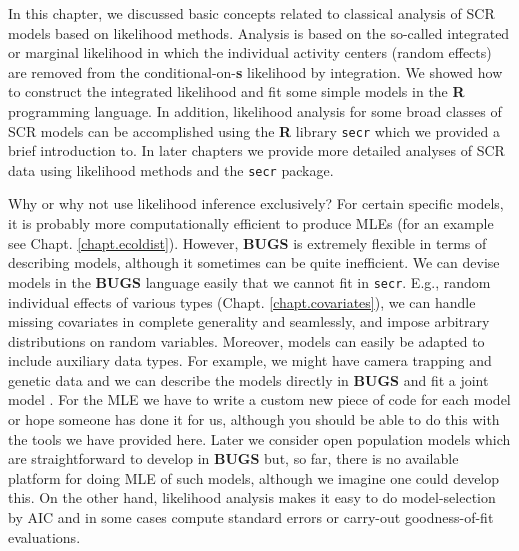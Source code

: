In this chapter, we discussed basic concepts related to classical
analysis of SCR models based on likelihood methods. Analysis is based
on the so-called integrated or marginal likelihood in which the
individual activity centers (random effects) are removed from the
conditional-on-{\bf s} likelihood by integration. We showed how to
construct the integrated likelihood and fit some simple models in the
{\bf R} programming language.  In addition, likelihood analysis for
some broad classes of SCR models can be accomplished using the {\bf R}
library \mbox{\tt secr} \citep{efford:2011} which we provided a brief
introduction to. In later chapters we provide more detailed analyses
of SCR data using likelihood methods and the \mbox{\tt secr} package.

\begin{comment}
To compute the marginal (integrated) likelihood we have to precisely describe the
state-space of the underlying point process. In practice, this leads
to a ``buffer'' around the trap array. We note that this is not really a
``buffer strip'' in the sense of \citet{wilson_anderson:1985a},  
but it is somewhat more general here. In particular,
it establishes the support of the integrand and, 
in SCR models, it is an element of the model that
provides an explicit
linkage between population size $N$ and density $D$.
As a practical 
matter, it will typically be the case that, while estimates of $N$
increase with the area of the state-space (as they should!), estimates of density
stabilize. This is not a feature of the classical methods based on
using model $M_0$ or model $M_h$ and buffering the trap array.
\end{comment}

Why or why not use likelihood inference exclusively? For certain
specific models, it is probably more computationally efficient to
produce MLEs (for an example see
Chapt. \ref{chapt.ecoldist}). However, {\bf BUGS} is extremely
flexible in terms of describing models, although it sometimes can be
quite inefficient. We can devise models in the {\bf BUGS} language
easily that we cannot fit in \mbox{\tt secr}. E.g., random individual
effects of various types (Chapt. \ref{chapt.covariates}), we can
handle missing covariates in complete generality and seamlessly, and
impose arbitrary distributions on random variables. Moreover, models
can easily be adapted to include auxiliary data types. For example, we
might have camera trapping and genetic data and we can describe the
models directly in {\bf BUGS} and fit a joint model
\citep{gopalaswamy_etal:2012ecol}. For the MLE we have to write a custom
new piece of code for each model or hope someone has done it for us,
although you should be able to do this with the tools we have provided
here.  Later we consider open population models which are
straightforward to develop in {\bf BUGS} but, so far, there is no
available platform for doing MLE of such models, although we imagine
one could develop this.  On the other hand, likelihood analysis makes
it easy to do model-selection by AIC and in some cases compute
standard errors or carry-out goodness-of-fit evaluations.  


